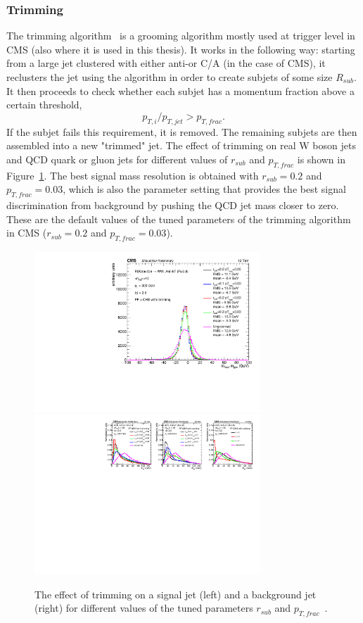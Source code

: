 \subsubsection{Trimming}
\label{sec:objreco:trimming}
The trimming algorithm~\cite{Krohn:2009th} is a grooming algorithm mostly used at trigger level in CMS (also where it is used in this thesis). It works in the following way: starting from a large jet clustered with either anti-\kt or C/A (in the case of CMS), it reclusters the jet using the \kt algorithm in order to create subjets of some size $R_{sub}$.  It then proceeds to check whether each subjet has a momentum fraction above a certain threshold,
\begin{equation*}
p_{T,i}/p_{T,jet}>p_{T,frac}.
\end{equation*}
If the subjet fails this requirement, it is removed. The remaining subjets are then assembled into a new "trimmed" jet.
The effect of trimming on real W boson jets and QCD quark or gluon jets for different values of $r_{sub}$ and $p_{T,frac}$ is shown in Figure~\ref{fig:objreco:trimming}. 
The best signal mass resolution is obtained with $r_{sub}=0.2$ and $p_{T,frac}=0.03$, which is also the parameter setting that provides the best signal discrimination from background by pushing the QCD jet mass closer to zero. These are the default values of the tuned parameters of the trimming algorithm in CMS ($r_{sub}=0.2$ and $p_{T,frac}=0.03$).
\begin{figure}[h!] 
    \centering 
    \includegraphics[height=6cm]{figures/event_reconstruction/sig_trimming.pdf}
    \includegraphics[height=6cm]{figures/event_reconstruction/bkg_trimming-noData.pdf}
    \caption{The effect of trimming on a signal jet (left) and a background jet (right) for different values of the tuned parameters $r_{sub}$ and $p_{T,frac}$~\cite{CMS-PAS-JME-14-001}.}
    \label{fig:objreco:trimming}
\end{figure}

